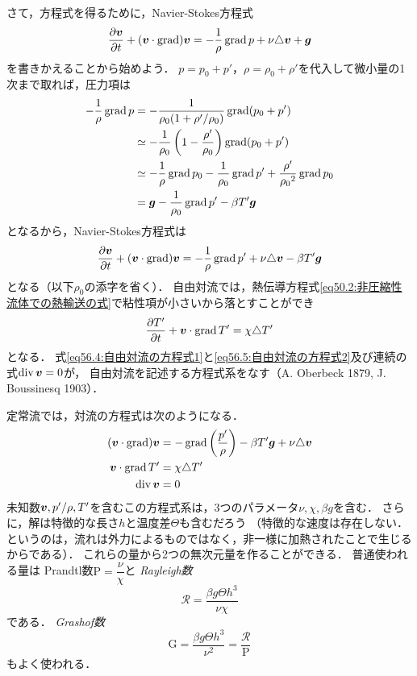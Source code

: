 さて，方程式を得るために，Navier-Stokes方程式
\[
    \pdv{\vb*{v}}{t} + (\vb*{v}\cdot\operatorname{grad}) \vb*{v} = - \frac{1}{\rho} \operatorname{grad} p + \nu \triangle\vb*{v} + \vb*{g}
\]
を書きかえることから始めよう．
$p=p_0+p'$，$\rho=\rho_0+\rho'$を代入して微小量の1次まで取れば，圧力項は
\begin{align*}
    - \frac{1}{\rho} \operatorname{grad} p
    &= - \frac{1}{\rho_0 (1+\rho'/\rho_0)} \operatorname{grad} (p_0 + p') \\
    &\simeq - \frac{1}{\rho_0} \left( 1 - \frac{\rho'}{\rho_0} \right) \operatorname{grad} (p_0 + p') \\
    &\simeq - \frac{1}{\rho} \operatorname{grad} p_0 - \frac{1}{\rho_0} \operatorname{grad} p' + \frac{\rho'}{{\rho_0}^2} \operatorname{grad} p_0 \\
    &= \vb*{g} - \frac{1}{\rho_0} \operatorname{grad} p' - \beta T' \vb*{g}
\end{align*}
となるから，Navier-Stokes方程式は
\begin{equation}\label{eq56.4:自由対流の方程式1}
    \pdv{\vb*{v}}{t} + (\vb*{v}\cdot\operatorname{grad}) \vb*{v} = - \frac{1}{\rho} \operatorname{grad} p' + \nu \triangle\vb*{v} -\beta T' \vb*{g}
\end{equation}
となる（以下$\rho_0$の添字を省く）．
自由対流では，熱伝導方程式\eqref{eq50.2:非圧縮性流体での熱輸送の式}で粘性項が小さいから落とすことができ
\begin{equation}\label{eq56.5:自由対流の方程式2}
    \pdv{T'}{t} + \vb*{v} \cdot \operatorname{grad} T' = \chi \triangle T'
\end{equation}
となる．
式\eqref{eq56.4:自由対流の方程式1}と\eqref{eq56.5:自由対流の方程式2}及び連続の式$\operatorname{div}\vb*{v}=0$が，
自由対流を記述する方程式系をなす（A. Oberbeck 1879, J. Boussinesq 1903）．




定常流では，対流の方程式は次のようになる．
\begin{align}
    (\vb*{v}\cdot\operatorname{grad}) \vb*{v} &= -\operatorname{grad} \left( \frac{p'}{\rho} \right) - \beta T' \vb*{g} + \nu \triangle\vb*{v} \\
    \vb*{v} \cdot \operatorname{grad} T' &= \chi \triangle T' \\
    \operatorname{div} \vb*{v} &= 0
\end{align}
未知数$\vb*{v}, p'/\rho, T'$を含むこの方程式系は，3つのパラメータ$\nu, \chi, \beta g$を含む．
さらに，解は特徴的な長さ$h$と温度差$\Theta$も含むだろう
（特徴的な速度は存在しない．というのは，流れは外力によるものではなく，非一様に加熱されたことで生じるからである）．
これらの量から2つの無次元量を作ることができる．
普通使われる量は
Prandtl数$\mathrm{P}=\dfrac{\nu}{\chi}$と
\emph{Rayleigh数}
\begin{equation}
    \mathscr{R} = \frac{\beta g \Theta h^3}{\nu\chi}
\end{equation}
である．
\emph{Grashof数}
\[
    \mathrm{G} = \frac{\beta g \Theta h^3}{\nu^2} = \frac{\mathscr{R}}{\mathrm{P}}
\]
もよく使われる．




